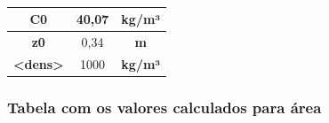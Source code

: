 \begin{table}[H]
	\centering
	\begin{tabular}{|c|c|c|}
		\hline
		\textbf{C0} & 40,07 & \textbf{kg/m³} \\ \hline
		\textbf{z0} & 0,34 & \textbf{m} \\ \hline
		\textbf{\textless{}dens\textgreater{}} & 1000 & \textbf{kg/m³} \\ \hline
	\end{tabular}
	\caption{}
	\label{rhomedio}
\end{table}



\subsubsection{Tabela com os valores calculados para área}

